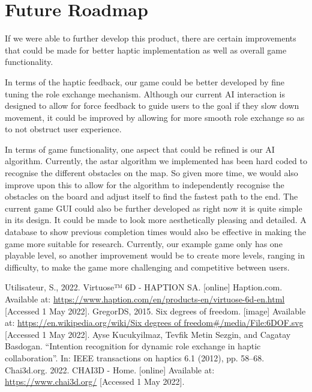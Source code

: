 \documentclass[a4paper]{article}
\begin{document}
\section{Future Roadmap}
If we were able to further develop this product, there are certain improvements that could be made for better haptic implementation as well as overall game functionality. 

In terms of the haptic feedback, our game could be better developed by fine tuning the role exchange mechanism. Although our current AI interaction is designed to allow for force feedback to guide users to the goal if they slow down movement, it could be improved by allowing for more smooth role exchange so as to not obstruct user experience.

In terms of game functionality, one aspect that could be refined is our AI algorithm. Currently, the astar algorithm we implemented has been hard coded to recognise the different obstacles on the map. So given more time, we would also improve upon this to allow for the algorithm to independently recognise the obstacles on the board and adjust itself to find the fastest path to the end. The current game GUI could also be further developed as right now it is quite simple in its design. It could be made to look more aesthetically pleasing and detailed. A database to show previous completion times would also be effective in making the game more suitable for research. Currently, our example game only has one playable level, so another improvement would be to create more levels, ranging in difficulty, to make the game more challenging and competitive between users.

\newpage

\begin{thebibliography}{99}
Utilisateur, S., 2022. Virtuose™ 6D - HAPTION SA. [online] Haption.com. Available at: \url{https://www.haption.com/en/products-en/virtuose-6d-en.html} [Accessed 1 May 2022].
GregorDS, 2015. Six degrees of freedom. [image] Available at: \url{https://en.wikipedia.org/wiki/Six degrees of freedom#/media/File:6DOF.svg} [Accessed 1 May 2022]. 
Ayse Kucukyilmaz, Tevfik Metin Sezgin, and Cagatay Basdogan. “Intention recognition for
dynamic role exchange in haptic collaboration”. In: IEEE transactions on haptics 6.1 (2012),
pp. 58–68.
Chai3d.org. 2022. CHAI3D - Home. [online] Available at: \url{https://www.chai3d.org/} [Accessed 1 May 2022].
\end{thebibliography}
\end{document}
